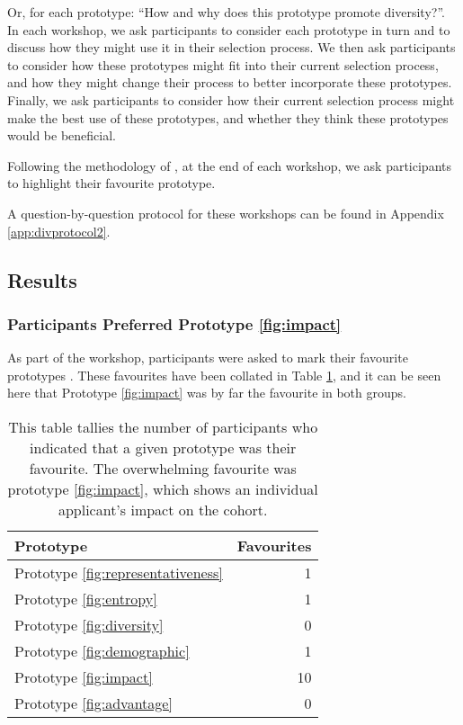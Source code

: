 \noindent Or, for each prototype: ``How and why does this prototype promote diversity?''. In each workshop, we ask participants to consider each prototype in turn and to discuss how they might use it in their selection process. We then ask participants to consider how these prototypes might fit into their current selection process, and how they might change their process to better incorporate these prototypes. Finally, we ask participants to consider how their current selection process might make the best use of these prototypes, and whether they think these prototypes would be beneficial. 

Following the methodology of \textcite{Gatian_1994,Griffiths_Johnson_Hartley_2007}, at the end of each workshop, we ask participants to highlight their favourite prototype.

A question-by-question protocol for these workshops can be found in Appendix \ref{app:divprotocol2}.

\subsection{Results}\label{ssec:results2}
\subsubsection{Participants Preferred Prototype \ref{fig:impact}}
As part of the workshop, participants were asked to mark their favourite prototypes \cite{Gatian_1994,Griffiths_Johnson_Hartley_2007}. These favourites have been collated in Table \ref{tab:favourites}, and it can be seen here that Prototype \ref{fig:impact} was by far the favourite in both groups.

\begin{table}[htbp]
    \centering
    \caption{This table tallies the number of participants who indicated that a given prototype was their favourite. The overwhelming favourite was prototype \ref{fig:impact}, which shows an individual applicant's impact on the cohort.}
    \label{tab:favourites}
    \begin{tabular}{lr}
        \toprule
        \textbf{Prototype} & \textbf{Favourites} \\
        \midrule
        Prototype \ref{fig:representativeness} & 1 \\
        Prototype \ref{fig:entropy} & 1 \\
        Prototype \ref{fig:diversity} & 0 \\
        Prototype \ref{fig:demographic} & 1 \\
        Prototype \ref{fig:impact} & 10 \\
        Prototype \ref{fig:advantage} & 0 \\
        \bottomrule
    \end{tabular}
\end{table}

